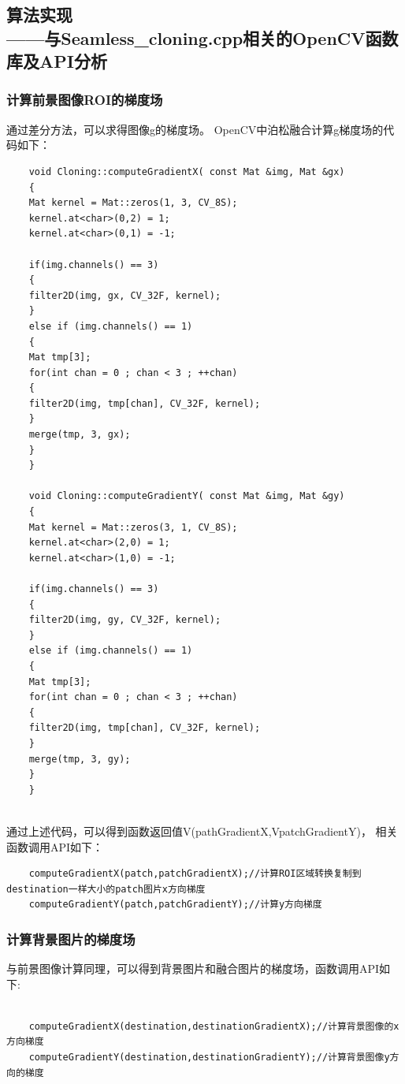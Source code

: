 \documentclass{article}
\begin{document}
    \subsection{算法实现
    	\\——与Seamless_cloning.cpp相关的OpenCV函数库及API分析}
    \subsubsection{计算前景图像ROI的梯度场}
    通过差分方法，可以求得图像g的梯度场。
    OpenCV中泊松融合计算g梯度场的代码如下：
    \begin{lstlisting}
    void Cloning::computeGradientX( const Mat &img, Mat &gx)
    {
    Mat kernel = Mat::zeros(1, 3, CV_8S);
    kernel.at<char>(0,2) = 1;
    kernel.at<char>(0,1) = -1;
    
    if(img.channels() == 3)
    {
    filter2D(img, gx, CV_32F, kernel);
    }
    else if (img.channels() == 1)
    {
    Mat tmp[3];
    for(int chan = 0 ; chan < 3 ; ++chan)
    {
    filter2D(img, tmp[chan], CV_32F, kernel);
    }
    merge(tmp, 3, gx);
    }
    }
    
    void Cloning::computeGradientY( const Mat &img, Mat &gy)
    {
    Mat kernel = Mat::zeros(3, 1, CV_8S);
    kernel.at<char>(2,0) = 1;
    kernel.at<char>(1,0) = -1;
    
    if(img.channels() == 3)
    {
    filter2D(img, gy, CV_32F, kernel);
    }
    else if (img.channels() == 1)
    {
    Mat tmp[3];
    for(int chan = 0 ; chan < 3 ; ++chan)
    {
    filter2D(img, tmp[chan], CV_32F, kernel);
    }
    merge(tmp, 3, gy);
    }
    }
    
   \end{lstlisting}
    通过上述代码，可以得到函数返回值V(pathGradientX,VpatchGradientY)，
    相关函数调用API如下：
    \begin{lstlisting}
    computeGradientX(patch,patchGradientX);//计算ROI区域转换复制到destination一样大小的patch图片x方向梯度
    computeGradientY(patch,patchGradientY);//计算y方向梯度
    \end{lstlisting}
 

    \subsubsection{计算背景图片的梯度场}
     与前景图像计算同理，可以得到背景图片和融合图片的梯度场，函数调用API如下:
    \begin{lstlisting}
       
    computeGradientX(destination,destinationGradientX);//计算背景图像的x方向梯度
    computeGradientY(destination,destinationGradientY);//计算背景图像y方向的梯度
    \end{lstlisting}
\end{document}
